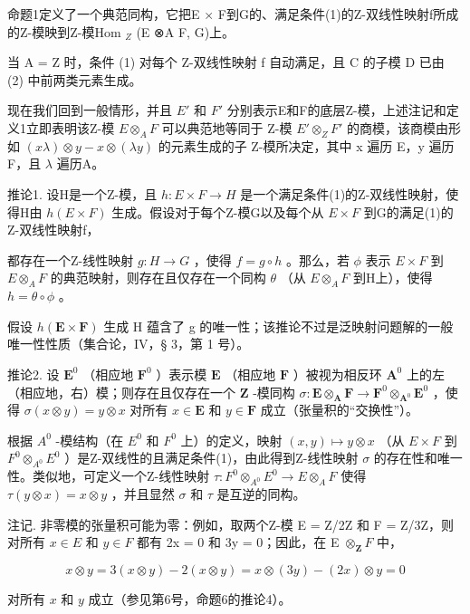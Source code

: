 命题1定义了一个典范同构，它把E × F到G的、满足条件(1)的Z-双线性映射f所成的Z-模映到Z-模Hom \(_{Z}\) (E ⊗A F, G)上。

当 A = Z 时，条件 (1) 对每个 Z-双线性映射 f 自动满足，且 C 的子模 D 已由 (2) 中前两类元素生成。

现在我们回到一般情形，并且 \(E'\) 和 \(F'\) 分别表示E和F的底层Z-模，上述注记和定义1立即表明该Z-模 \(E \otimes_{A} F\) 可以典范地等同于 Z-模 \(E' \otimes_{Z} F'\) 的商模，该商模由形如 \((x\lambda) \otimes y - x \otimes (\lambda y)\) 的元素生成的子 Z-模所决定，其中 x 遍历 E，y 遍历 F，且 \(\lambda\) 遍历A。

推论1. 设H是一个Z-模，且 \(h:E \times F \rightarrow H\) 是一个满足条件(1)的Z-双线性映射，使得H由 \(h(E \times F)\) 生成。假设对于每个Z-模G以及每个从 \(E \times F\) 到G的满足(1)的Z-双线性映射f，

都存在一个Z-线性映射 \(g:H \to G\) ，使得 \(f = g \circ h\) 。那么，若 \(\phi\) 表示 \(E \times F\) 到 \(E \otimes_{A} F\) 的典范映射，则存在且仅存在一个同构 \(\theta\) （从 \(E \otimes_{A} F\) 到H上），使得 \(h = \theta \circ \phi\) 。

假设 \(h(\mathbf{E} \times \mathbf{F})\) 生成 H 蕴含了 g 的唯一性；该推论不过是泛映射问题解的一般唯一性性质（集合论，IV，§ 3，第 1 号）。

推论2. 设 \(\mathbf{E}^0\) （相应地 \(\mathbf{F}^0\) ）表示模 \(\mathbf{E}\) （相应地 \(\mathbf{F}\) ）被视为相反环 \(\mathbf{A}^0\) 上的左（相应地，右）模；则存在且仅存在一个 \(\mathbf{Z}\) -模同构 \(\sigma: \mathbf{E} \otimes_{\mathbf{A}} \mathbf{F} \to \mathbf{F}^0 \otimes_{\mathbf{A}^0} \mathbf{E}^0\) ，使得 \(\sigma(x \otimes y) = y \otimes x\) 对所有 \(x \in \mathbf{E}\) 和 \(y \in \mathbf{F}\) 成立（张量积的“交换性”）。

根据 \(A^{0}\) -模结构（在 \(E^{0}\) 和 \(F^{0}\) 上）的定义，映射 \((x,y)\mapsto y\otimes x\) （从 \(E\times F\) 到 \(F^{0}\otimes_{A^{0}}E^{0}\) ）是Z-双线性的且满足条件(1)，由此得到Z-线性映射 \(\sigma\) 的存在性和唯一性。类似地，可定义一个Z-线性映射 \(\tau:F^{0}\otimes_{A^{0}}E^{0}\to E\otimes_{A}F\) 使得 \(\tau(y\otimes x)=x\otimes y\) ，并且显然 \(\sigma\) 和 \(\tau\) 是互逆的同构。

注记. 非零模的张量积可能为零：例如，取两个Z-模 E = Z/2Z 和 F = Z/3Z，则对所有 \(x \in E\) 和 \(y \in F\) 都有 2x = 0 和 3y = 0；因此，在 E \(\otimes_{\mathbf{Z}} F\) 中，

\[
x \otimes y = 3 (x \otimes y) - 2 (x \otimes y) = x \otimes (3 y) - (2 x) \otimes y = 0
\]

对所有 \(x\) 和 \(y\) 成立（参见第6号，命题6的推论4）。

